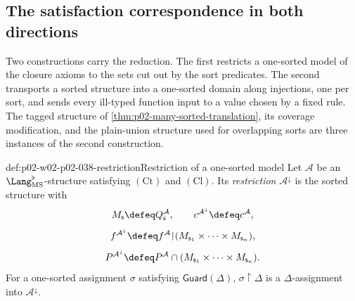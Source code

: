 \subsection{The satisfaction correspondence in both directions}
\label{sec:p02-w02-p02-038-correspondence}

Two constructions carry the reduction.  The first restricts a one-sorted model
of the closure axioms to the sets cut out by the sort predicates.  The second
transports a sorted structure into a one-sorted domain along injections, one
per sort, and sends every ill-typed function input to a value chosen by a
fixed rule.  The tagged structure of \cref{thm:p02-many-sorted-translation},
its coverage modification, and the plain-union structure used for overlapping
sorts are three instances of the second construction.

\begin{hbdefinition}{def:p02-w02-p02-038-restriction}{Restriction of a one-sorted model}
Let \(\mathcal A\) be an \(\Lang_{\mathrm{MS}}^{\flat}\)-structure satisfying
\((\mathrm{Ct})\) and \((\mathrm{Cl})\).  Its \emph{restriction}
\(\mathcal A^{\downarrow}\) is the sorted structure with
\[
 M_{\mathsf s}\defeq Q_{\mathsf s}^{\mathcal A},\qquad
 c^{\mathcal A^{\downarrow}}\defeq c^{\mathcal A},
\]
\[
 f^{\mathcal A^{\downarrow}}\defeq
   f^{\mathcal A}{\restriction}(M_{\mathsf s_1}\times\cdots\times M_{\mathsf s_n}),
\]
\[
 P^{\mathcal A^{\downarrow}}\defeq
   P^{\mathcal A}\cap(M_{\mathsf s_1}\times\cdots\times M_{\mathsf s_n}).
\]
For a one-sorted assignment \(\sigma\) satisfying \(\mathsf{Guard}(\Delta)\),
\(\sigma{\restriction}\Delta\) is a \(\Delta\)-assignment into
\(\mathcal A^{\downarrow}\).
\end{hbdefinition}


